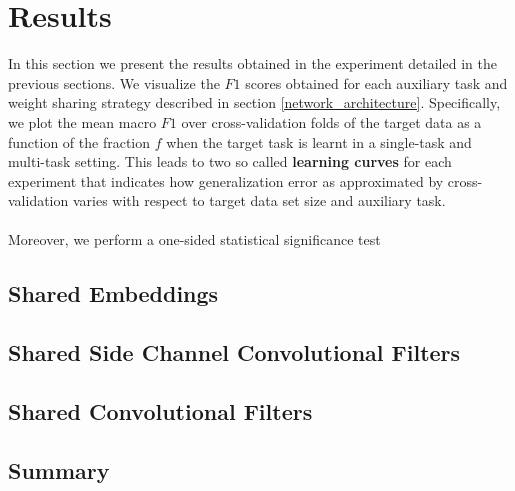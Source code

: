 \chapter{Results}
In this section we present the results obtained in the experiment detailed in the previous sections. We visualize the $F1$ scores obtained for each auxiliary task and weight sharing strategy described in section \ref{network_architecture}. Specifically, we plot the mean macro $F1$ over cross-validation folds of the target data as a function of the fraction $f$ when the target task is learnt in a single-task and multi-task setting. This leads to two so called \textbf{learning curves} for each experiment that indicates how generalization error as approximated by cross-validation varies with respect to target data set size and auxiliary task.
\\\\
Moreover, we perform a one-sided statistical significance test

\section{Shared Embeddings}
\section{Shared Side Channel Convolutional Filters}
\begin{figure}
	
\end{figure}
\begin{figure}
	
\end{figure}
\begin{figure}
	
\end{figure}
\begin{figure}
	
\end{figure}
\section{Shared Convolutional Filters}
\begin{figure}
	
\end{figure}

\section{Summary}